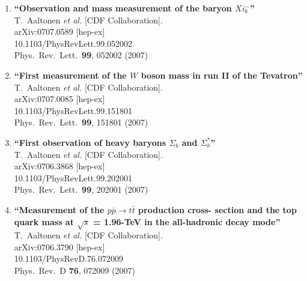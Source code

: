 \documentclass{article}
\begin{document}
\begin{enumerate}
\item%
{\bf ``Observation and mass measurement of the baryon $Xi_b^-$''}
  \\{}T.~Aaltonen {\it et al.}  [CDF Collaboration].
  \\{}arXiv:0707.0589 [hep-ex]
    \\{}10.1103/PhysRevLett.99.052002
\\{}Phys.\ Rev.\ Lett.\  {\bf 99}, 052002 (2007) %


\item%
{\bf ``First measurement of the $W$ boson mass in run II of the Tevatron''}
  \\{}T.~Aaltonen {\it et al.}  [CDF Collaboration].
  \\{}arXiv:0707.0085 [hep-ex]
    \\{}10.1103/PhysRevLett.99.151801
\\{}Phys.\ Rev.\ Lett.\  {\bf 99}, 151801 (2007) %


\item%
{\bf ``First observation of heavy baryons $\Sigma_{b}$ and $\Sigma_{b}^*$''}
  \\{}T.~Aaltonen {\it et al.}  [CDF Collaboration].
  \\{}arXiv:0706.3868 [hep-ex]
    \\{}10.1103/PhysRevLett.99.202001
\\{}Phys.\ Rev.\ Lett.\  {\bf 99}, 202001 (2007) %


\item%
{\bf ``Measurement of the $p \bar{p} \to t \bar{t}$ production cross- section and the top quark mass at $\sqrt{s}$ = 1.96-TeV in the all-hadronic decay mode''}
  \\{}T.~Aaltonen {\it et al.}  [CDF Collaboration].
  \\{}arXiv:0706.3790 [hep-ex]
    \\{}10.1103/PhysRevD.76.072009
\\{}Phys.\ Rev.\ D {\bf 76}, 072009 (2007) %



\end{enumerate}
\end{document}
